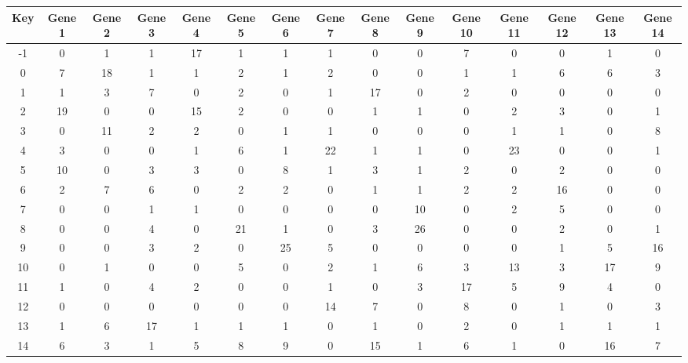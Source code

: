 \begin{tabular}{|c|c|c|c|c|c|c|c|c|c|c|c|c|c|c|}
\hline
Key & Gene 1 & Gene 2 & Gene 3 & Gene 4 & Gene 5 & Gene 6 & Gene 7 & Gene 8 & Gene 9 & Gene 10 & Gene 11 & Gene 12 & Gene 13 & Gene 14 \\
\hline
-1 & 0 & 1 & 1 & 17 & 1 & 1 & 1 & 0 & 0 & 7 & 0 & 0 & 1 & 0 \\
0 & 7 & 18 & 1 & 1 & 2 & 1 & 2 & 0 & 0 & 1 & 1 & 6 & 6 & 3 \\
1 & 1 & 3 & 7 & 0 & 2 & 0 & 1 & 17 & 0 & 2 & 0 & 0 & 0 & 0 \\
2 & 19 & 0 & 0 & 15 & 2 & 0 & 0 & 1 & 1 & 0 & 2 & 3 & 0 & 1 \\
3 & 0 & 11 & 2 & 2 & 0 & 1 & 1 & 0 & 0 & 0 & 1 & 1 & 0 & 8 \\
4 & 3 & 0 & 0 & 1 & 6 & 1 & 22 & 1 & 1 & 0 & 23 & 0 & 0 & 1 \\
5 & 10 & 0 & 3 & 3 & 0 & 8 & 1 & 3 & 1 & 2 & 0 & 2 & 0 & 0 \\
6 & 2 & 7 & 6 & 0 & 2 & 2 & 0 & 1 & 1 & 2 & 2 & 16 & 0 & 0 \\
7 & 0 & 0 & 1 & 1 & 0 & 0 & 0 & 0 & 10 & 0 & 2 & 5 & 0 & 0 \\
8 & 0 & 0 & 4 & 0 & 21 & 1 & 0 & 3 & 26 & 0 & 0 & 2 & 0 & 1 \\
9 & 0 & 0 & 3 & 2 & 0 & 25 & 5 & 0 & 0 & 0 & 0 & 1 & 5 & 16 \\
10 & 0 & 1 & 0 & 0 & 5 & 0 & 2 & 1 & 6 & 3 & 13 & 3 & 17 & 9 \\
11 & 1 & 0 & 4 & 2 & 0 & 0 & 1 & 0 & 3 & 17 & 5 & 9 & 4 & 0 \\
12 & 0 & 0 & 0 & 0 & 0 & 0 & 14 & 7 & 0 & 8 & 0 & 1 & 0 & 3 \\
13 & 1 & 6 & 17 & 1 & 1 & 1 & 0 & 1 & 0 & 2 & 0 & 1 & 1 & 1 \\
14 & 6 & 3 & 1 & 5 & 8 & 9 & 0 & 15 & 1 & 6 & 1 & 0 & 16 & 7 \\
\hline
\end{tabular}